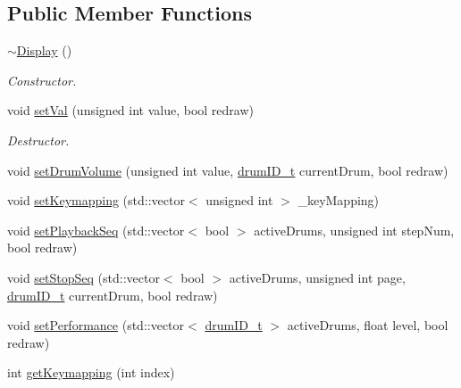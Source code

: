 \subsection*{Public Member Functions}
\begin{DoxyCompactItemize}
\item 
\mbox{\label{classdrumpi_1_1Display_ac2607a6bb236c55547a4223d40d85d1f}} 
\hyperlink{classdrumpi_1_1Display_ac2607a6bb236c55547a4223d40d85d1f}{$\sim$\+Display} ()
\begin{DoxyCompactList}\small\item\em Constructor. \end{DoxyCompactList}\item 
void \hyperlink{classdrumpi_1_1Display_a736439f0512941aed6a870343a6dfcb4}{set\+Val} (unsigned int value, bool redraw)
\begin{DoxyCompactList}\small\item\em Destructor. \end{DoxyCompactList}\item 
void \hyperlink{classdrumpi_1_1Display_a7ddc806af584e6cde78b68400aac9a32}{set\+Drum\+Volume} (unsigned int value, \hyperlink{namespacedrumpi_a3897274035c1b939a604438abe648b1b}{drum\+I\+D\+\_\+t} current\+Drum, bool redraw)
\item 
void \hyperlink{classdrumpi_1_1Display_a2da5a80f0fe89c46142fb612e89a3bbc}{set\+Keymapping} (std\+::vector$<$ unsigned int $>$ \+\_\+key\+Mapping)
\item 
void \hyperlink{classdrumpi_1_1Display_a7b1a1df8eb13768b89c5b48eb2b319eb}{set\+Playback\+Seq} (std\+::vector$<$ bool $>$ active\+Drums, unsigned int step\+Num, bool redraw)
\item 
void \hyperlink{classdrumpi_1_1Display_ae253a08f20fdd1256658c81c64164dbd}{set\+Stop\+Seq} (std\+::vector$<$ bool $>$ active\+Drums, unsigned int page, \hyperlink{namespacedrumpi_a3897274035c1b939a604438abe648b1b}{drum\+I\+D\+\_\+t} current\+Drum, bool redraw)
\item 
void \hyperlink{classdrumpi_1_1Display_a695bf2d6c688b87ad88bc3fbd8fa1fff}{set\+Performance} (std\+::vector$<$ \hyperlink{namespacedrumpi_a3897274035c1b939a604438abe648b1b}{drum\+I\+D\+\_\+t} $>$ active\+Drums, float level, bool redraw)
\item 
int \hyperlink{classdrumpi_1_1Display_a98f1e8a6fe644f75dc086cf23c5687c6}{get\+Keymapping} (int index)
\end{DoxyCompactItemize}
